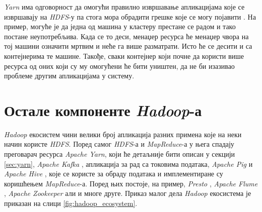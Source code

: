 \documentclass[12pt,oneside]{memoir}
\begin{document}

\textit{Yarn} има одговорност да омогући правилно извршавање апликацијама које се извршавају на \textit{HDFS}-у па стога мора обрадити грешке које се могу појавити \cite{hadoop_learning}. На пример, могуће је да једна од машина у кластеру престане се радом и тако постане неупотребљива. Када се то деси, менаџер ресурса ће менаџер чвора на тој машини означити мртвим и неће га више разматрати. Исто ће се десити и са контејнерима те машине. Такође, сваки контејнер који почне да користи више ресурса од оних који су му омогућени ће бити уништен, да не би изазивао проблеме другим апликацијама у систему.

\section{Остале компоненте \textit{Hadoop}-а}
\label{sec:ostale_komp_hadupa}

\textit{Hadoop} екосистем чини велики број апликација разних примена које на неки начин користе \textit{HDFS}. Поред самог \textit{HDFS}-а и \textit{MapReduce}-а у њега спадају преговарач ресурса \textit{Apache Yarn}, који ће детаљније бити описан у секцији \ref{sec:yarn}, \textit{Apache Kafka} \cite{apache_kafka}, апликација за рад са токовима података, \textit{Apache Pig} \cite{apache_pig} и \textit{Apache Hive} \cite{apache_hive}, које се користе за обраду података и имплементиране су коришћењем \textit{MapReduce}-а. Поред њих постоје, на пример,  \textit{Presto} \cite{presto}, \textit{Apache Flume} \cite{apache_flume}, \textit{Apache Zookeeper} \cite{apache_zookeeper} али и многе друге. Приказ малог дела \textit{Hadoop} екосистема је приказан на слици \ref{fig:hadoop_ecosystem}.
\end{document}
